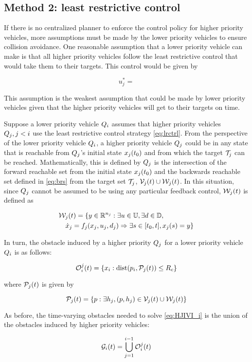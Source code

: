 \subsection{Method 2: least restrictive control}
If there is no centralized planner to enforce the control policy for higher priority vehicles, more assumptions must be made by the lower priority vehicles to ensure collision avoidance. One reasonable assumption that a lower priority vehicle can make is that all higher priority vehicles follow the least restrictive control that would take them to their targets. This control would be given by 

\begin{equation}
\label{eq:lrctrl} %
u_j^* =
\end{equation}

This assumption is the weakest assumption that could be made by lower priority vehicles given that the higher priority vehicles will get to their targets on time.

Suppose a lower priority vehicle $Q_i$ assumes that higher priority vehicles $Q_j, j < i$ use the least restrictive control strategy \eqref{eq:lrctrl}. From the perspective of the lower priority vehicle $Q_i$, a higher priority vehicle $Q_j$ could be in any state that is reachable from $Q_j$'s initial state $x_j(t_0)$ and from which the target $\mathcal{T}_j$ can be reached. Mathematically, this is defined by $Q_j$ is the intersection of the forward reachable set from the initial state $x_j(t_0)$ and the backwards reachable set defined in \eqref{eq:brs} from the target set $\mathcal{T}_j$, $\mathcal{V}_j(t) \cup \mathcal{W}_j(t)$. In this situation, since $Q_j$ cannot be assumed to be using any particular feedback control, $\mathcal{W}_j(t)$ is defined as

\begin{equation}
\label{eq:frs2}
\begin{aligned}
&\mathcal{W}_j(t) = \{y \in \mathbb{R}^{n_j}: \exists u \in \mathbb{U}, \exists d \in \mathbb{D}, \\
& \quad \dot{x}_j = f_j(x_j, u_j, d_j) \Rightarrow \exists s \in [t_0, t], x_j(s) = y\}
\end{aligned}
\end{equation}

In turn, the obstacle induced by a higher priority $Q_j$ for a lower priority vehicle $Q_i$ is as follows:

\begin{equation}
\mathcal{O}_i^j(t) = \{x_i: \text{dist}(p_i, \mathcal{P}_j(t)) \le R_c \}
\end{equation}

\noindent where $\mathcal{P}_j(t)$ is given by

\begin{equation}
\mathcal{P}_j(t) = \{p: \exists h_j, (p, h_j) \in \mathcal{V}_j(t) \cup \mathcal{W}_j(t)\}
\end{equation}

As before, the time-varying obstacles needed to solve \eqref{eq:HJIVI_i} is the union of the obstacles induced by higher priority vehicles:

\begin{equation}
\mathcal{G}_i(t) = \bigcup_{j=1}^{i-1}\mathcal{O}_i^j(t)
\end{equation}